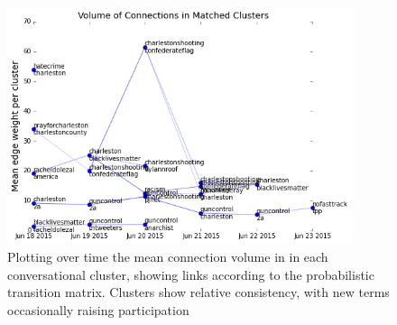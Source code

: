 \documentclass[12pt]{article}
\begin{document}
\begin{figure}[!ht]
  \centering
    \includegraphics[width=0.9\textwidth]{F8_Matched_cluster_timeseries.png}
    \caption{Plotting over time the mean connection volume in in each conversational cluster,  showing links according to the probabilistic transition matrix. Clusters show relative consistency, with new terms occasionally raising participation}
  \label{fig:cluster_volume_graphs}
\end{figure}
\end{document}
